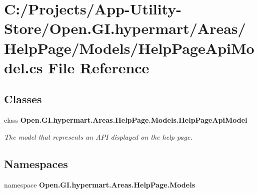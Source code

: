 \section{C\+:/\+Projects/\+App-\/\+Utility-\/\+Store/\+Open.G\+I.\+hypermart/\+Areas/\+Help\+Page/\+Models/\+Help\+Page\+Api\+Model.cs File Reference}
\label{_help_page_api_model_8cs}
\subsection*{Classes}
\begin{DoxyCompactItemize}
\item 
class \textbf{ Open.\+G\+I.\+hypermart.\+Areas.\+Help\+Page.\+Models.\+Help\+Page\+Api\+Model}
\begin{DoxyCompactList}\small\item\em The model that represents an A\+PI displayed on the help page. \end{DoxyCompactList}\end{DoxyCompactItemize}
\subsection*{Namespaces}
\begin{DoxyCompactItemize}
\item 
namespace \textbf{ Open.\+G\+I.\+hypermart.\+Areas.\+Help\+Page.\+Models}
\end{DoxyCompactItemize}
